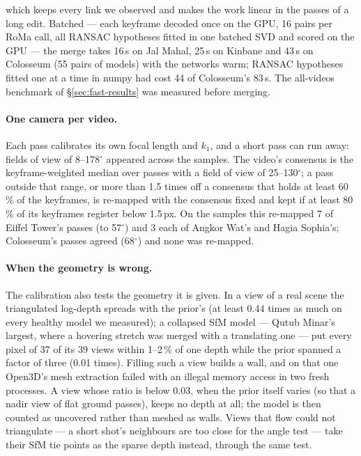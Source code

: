 \documentclass[10pt,a4paper,twocolumn]{article}
\begin{document}
which keeps every link we observed and makes the work linear in the passes of a long edit. Batched --- each keyframe decoded once on the GPU, 16 pairs per RoMa call, all RANSAC hypotheses fitted in one batched SVD and scored on the GPU --- the merge takes 16\,s on Jal Mahal, 25\,s on Kinbane and 43\,s on Colosseum (55 pairs of models) with the networks warm; RANSAC hypotheses fitted one at a time in numpy had cost 44 of Colosseum's 83\,s. The all-videos benchmark of \S\ref{sec:fast-results} was measured before merging.

\paragraph{One camera per video.} Each pass calibrates its own focal length and $k_1$, and a short pass can run away: fields of view of 8--178$^\circ$ appeared across the samples. The video's consensus is the keyframe-weighted median over passes with a field of view of 25--130$^\circ$; a pass outside that range, or more than 1.5 times off a consensus that holds at least 60\,\% of the keyframes, is re-mapped with the consensus fixed and kept if at least 80\,\% of its keyframes register below 1.5\,px. On the samples this re-mapped 7 of Eiffel Tower's passes (to 57$^\circ$) and 3 each of Angkor Wat's and Hagia Sophia's; Colosseum's passes agreed (68$^\circ$) and none was re-mapped.

\paragraph{When the geometry is wrong.} The calibration also tests the geometry it is given. In a view of a real scene the triangulated log-depth spreads with the prior's (at least 0.44 times as much on every healthy model we measured); a collapsed SfM model --- Qutub Minar's largest, where a hovering stretch was merged with a translating one --- put every pixel of 37 of its 39 views within 1--2\,\% of one depth while the prior spanned a factor of three (0.01 times). Filling such a view builds a wall, and on that one Open3D's mesh extraction failed with an illegal memory access in two fresh processes. A view whose ratio is below 0.03, when the prior itself varies (so that a nadir view of flat ground passes), keeps no depth at all; the model is then counted as uncovered rather than meshed as walls. Views that flow could not triangulate --- a short shot's neighbours are too close for the angle test --- take their SfM tie points as the sparse depth instead, through the same test.
\end{document}
